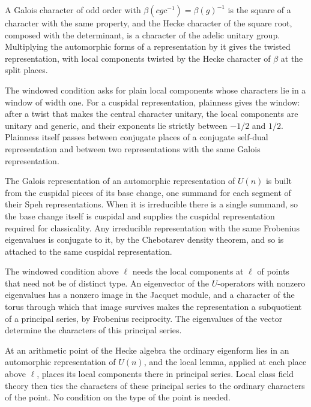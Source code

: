 A Galois character of odd order with $\beta(cgc^{-1})=\beta(g)^{-1}$ is the square of a character with the same property, and the Hecke character of the square root, composed with the determinant, is a character of the adelic unitary group. Multiplying the automorphic forms of a representation by it gives the twisted representation, with local components twisted by the Hecke character of $\beta$ at the split places.

The windowed condition asks for plain local components whose characters lie in a window of width one. For a cuspidal representation, plainness gives the window: after a twist that makes the central character unitary, the local components are unitary and generic, and their exponents lie strictly between $-1/2$ and $1/2$. Plainness itself passes between conjugate places of a conjugate self-dual representation and between two representations with the same Galois representation.

The Galois representation of an automorphic representation of $U(n)$ is built from the cuspidal pieces of its base change, one summand for each segment of their Speh representations. When it is irreducible there is a single summand, so the base change itself is cuspidal and supplies the cuspidal representation required for classicality. Any irreducible representation with the same Frobenius eigenvalues is conjugate to it, by the Chebotarev density theorem, and so is attached to the same cuspidal representation.

The windowed condition above $\ell$ needs the local components at $\ell$ of points that need not be of distinct type. An eigenvector of the $U$-operators with nonzero eigenvalues has a nonzero image in the Jacquet module, and a character of the torus through which that image survives makes the representation a subquotient of a principal series, by Frobenius reciprocity. The eigenvalues of the vector determine the characters of this principal series.

At an arithmetic point of the Hecke algebra the ordinary eigenform lies in an automorphic representation of $U(n)$, and the local lemma, applied at each place above $\ell$, places its local components there in principal series. Local class field theory then ties the characters of these principal series to the ordinary characters of the point. No condition on the type of the point is needed.

